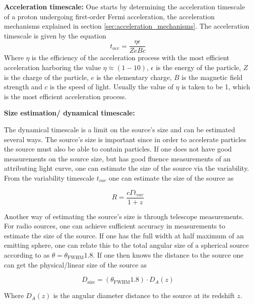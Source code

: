 \textbf{Acceleration timescale:}
One starts by determining the acceleration timescale of a proton undergoing first-order Fermi acceleration, the acceleration mechanisms explained in section \ref{sec:acceleration_mechanisms}. The acceleration timescale is given by the equation
\begin{equation}
    t_{acc} =  \frac{\eta \epsilon}{Z e B c}
\end{equation}
Where $\eta$ is the efficiency of the acceleration process with the most efficient acceleration harboring the value $\eta \approx (1-10)$, $\epsilon$ is the energy of the particle, $Z$ is the charge of the particle, $e$ is the elementary charge, $B$ is the magnetic field strength and $c$ is the speed of light. 
Usually the value of $\eta$ is taken to be 1, which is the most efficient acceleration process.

\textbf{Size estimation/ dynamical timescale:}
\label{sec:size_estimation}

The dynamical timescale is a limit on the source's size and can be estimated several ways. The source's size is important since in order to accelerate particles the source must also be able to contain particles. If one does not have good measurements on the source size, but has good fluence measurements of an attributing light curve, one can estimate the size of the source via the variability. From the variability timescale $t_{var}$ one can estimate the size of the source as

\begin{equation}
    R = \frac{c \Gamma t_{var}}{1+z}
\end{equation}

Another way of estimating the source's size is through telescope measurements. For radio sources, one can achieve sufficient accuracy in measurements to estimate the size of the source. If one has the full width at half maximum of an emitting sphere, one can relate this to the total angular size of a spherical source according to \cite{1983ApJ...264..296M} as $\theta = \theta_{\text{FWHM}} 1.8$. If one then knows the distance to the source one can get the physical/linear size of the source as

\begin{equation}
    D_{\text{size}} = \left(\theta_{\text{FWHM}}1.8 \right) \cdot D_A(z)
\end{equation}

Where $D_A(z)$ is the angular diameter distance to the source at its redshift $z$.

